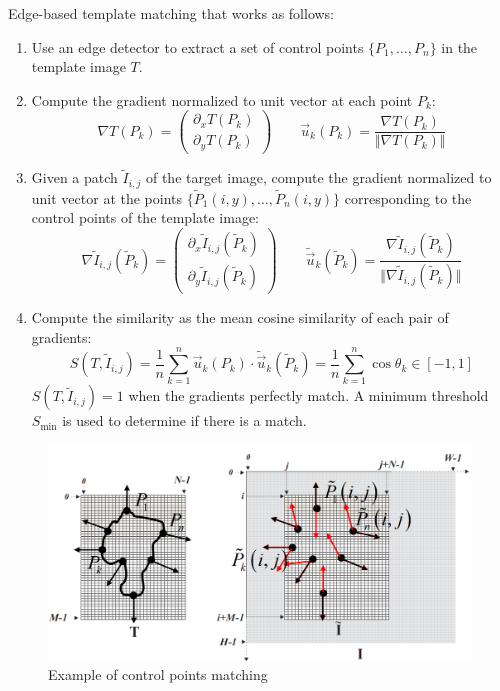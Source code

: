 Edge-based template matching that works as follows:
\begin{enumerate}
    \item Use an edge detector to extract a set of control points $\{ P_1, \dots, P_n \}$ in the template image $T$.
    \item Compute the gradient normalized to unit vector at each point $P_k$:
        \[ \nabla T(P_k) = \begin{pmatrix} \partial_x T(P_k) \\ \partial_y T(P_k) \end{pmatrix} \hspace{2em} \vec{u}_k(P_k) = \frac{\nabla T(P_k)}{\Vert \nabla T(P_k) \Vert} \]
    \item Given a patch $\tilde{I}_{i,j}$ of the target image, 
        compute the gradient normalized to unit vector at the points $\{ \tilde{P}_1(i, y), \dots, \tilde{P}_n(i, y) \}$ 
        corresponding to the control points of the template image:
        \[ 
            \nabla \tilde{I}_{i,j}(\tilde{P}_k) = \begin{pmatrix} \partial_x \tilde{I}_{i,j}(\tilde{P}_k) \\ \partial_y \tilde{I}_{i,j}(\tilde{P}_k) \end{pmatrix} \hspace{2em} 
            \tilde{\vec{u}}_k(\tilde{P}_k) = \frac{\nabla \tilde{I}_{i,j}(\tilde{P}_k)}{\Vert \nabla \tilde{I}_{i,j}(\tilde{P}_k) \Vert} 
        \]
    \item Compute the similarity as the mean cosine similarity of each pair of gradients:
        \[ S(T, \tilde{I}_{i,j}) = \frac{1}{n} \sum_{k=1}^{n} \vec{u}_k(P_k) \cdot \tilde{\vec{u}}_k(\tilde{P}_k) = \frac{1}{n} \sum_{k=1}^{n} \cos \theta_k \in [-1, 1] \]
        $S(T, \tilde{I}_{i,j}) = 1$ when the gradients perfectly match. A minimum threshold $S_\text{min}$ is used to determine if there is a match.
\end{enumerate}

\begin{figure}[H]
    \centering
    \includegraphics[width=0.5\linewidth]{./img/shape_based_matching.png}
    \caption{Example of control points matching}
\end{figure}



